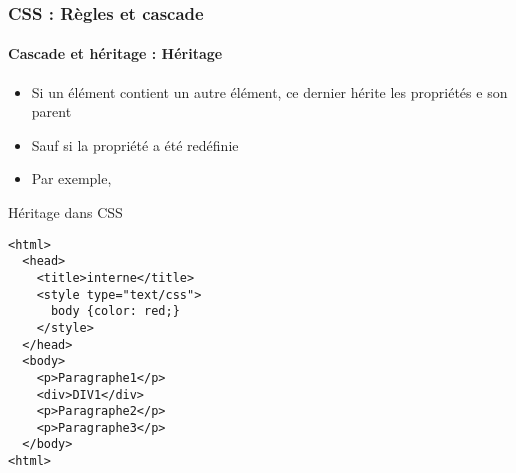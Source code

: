 \documentclass[xcolor=table]{beamer}
\begin{document}
\begin{frame}[fragile]
\frametitle{CSS : Règles et cascade}
\framesubtitle{Cascade et héritage : Héritage}

\begin{minipage}{0.60\textwidth}
\begin{itemize}
	\item Si un élément contient un autre élément, ce dernier hérite les propriétés e son parent
	\item Sauf si la propriété a été redéfinie
	\item Par exemple, 
\end{itemize}
\end{minipage}
%
\begin{minipage}{0.38\textwidth}
\begin{exampleblock}{Héritage dans CSS}
\lstset{escapeinside=**}
\scriptsize\bfseries
\begin{lstlisting}[language={HTML5}]
<html>
  <head>
    <title>interne</title>
    <style type="text/css">
      body {color: red;}
    </style>
  </head>
  <body>
    <p>Paragraphe1</p>
    <div>DIV1</div>
    <p>Paragraphe2</p>
    <p>Paragraphe3</p>
  </body>
<html>
\end{lstlisting}
\end{exampleblock}
\end{minipage}
\end{frame}
\end{document}
